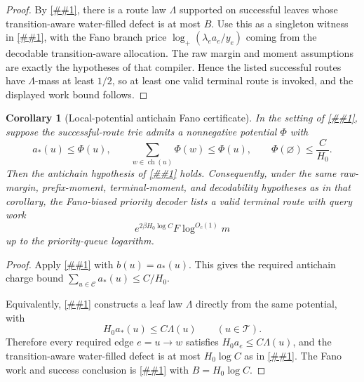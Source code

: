 \documentclass[10pt]{article}
\newcommand{\cref}[1]{\ref{##1}}
\newtheorem{corollary}[theorem]{Corollary}
\theoremstyle{definition}
\begin{document}
\begin{proof}
   By \cref{cor:antichain-transition-waterfill}, there is a route law
   \(\Lambda\) supported on successful leaves whose transition-aware
   water-filled defect is at most \(B\).  Use this as a singleton witness in
   \cref{cor:robust-fano-allocation-compiler}, with the Fano branch price
   \(\log_+(\lambda_ea_e/y_e)\) coming from the decodable transition-aware
   allocation.  The raw margin and moment assumptions are exactly the
   hypotheses of that compiler.  Hence the listed successful routes have
   \(\Lambda\)-mass at least \(1/2\), so at least one valid terminal route is
   invoked, and the displayed work bound follows.
\end{proof}

\begin{corollary}[Local-potential antichain Fano certificate]
   \label{cor:local-potential-antichain-fano}
   In the setting of \cref{cor:existential-antichain-fano}, suppose the
   successful-route trie admits a nonnegative potential \(\Phi\) with
   \[
      a_*(u)\le\Phi(u),
      \qquad
      \sum_{w\in\operatorname{ch}(u)}\Phi(w)\le\Phi(u),
      \qquad
      \Phi(\varnothing)\le \frac{C}{H_0}.
   \]
   Then the antichain hypothesis of
   \cref{cor:existential-antichain-fano} holds.  Consequently, under the same
   raw-margin, prefix-moment, terminal-moment, and decodability hypotheses as
   in that corollary, the Fano-biased priority decoder lists a valid terminal
   route with query work
   \[
      e^{2\beta H_0\log C}F\log^{O_c(1)}m
   \]
   up to the priority-queue logarithm.
\end{corollary}

\begin{proof}
   Apply \cref{lem:local-antichain-charge-potential} with
   \(b(u)=a_*(u)\).  This gives the required antichain charge bound
   \(\sum_{u\in\mathcal C}a_*(u)\le C/H_0\).

   Equivalently, \cref{lem:superharmonic-potential-route-law} constructs a
   leaf law \(\Lambda\) directly from the same potential, with
   \[
      H_0a_*(u)\le C\Lambda(u)
      \qquad(u\in\mathcal T).
   \]
   Therefore every required edge \(e=u\to w\) satisfies
   \(H_0a_e\le C\Lambda(u)\), and the transition-aware water-filled defect is
   at most \(H_0\log C\) as in
   \cref{cor:antichain-transition-waterfill}.  The Fano work and success
   conclusion is \cref{cor:existential-antichain-fano} with
   \(B=H_0\log C\).
\end{proof}
\end{document}
